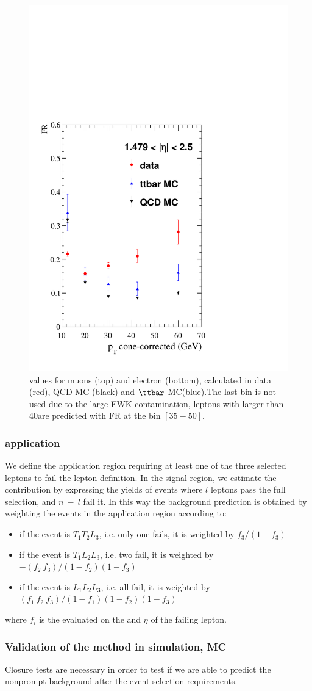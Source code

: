\begin{figure}[h!]
\includegraphics[width=.23\textwidth]{Figures/c5/FAKE/ele3.pdf}
\caption{\fr values for muons (top) and electron (bottom), calculated in data (red), QCD MC (black) and $\ttbar$ MC(blue).The last bin is not used due to the large EWK contamination, leptons with \pt larger than 40\GeV are predicted with FR at the bin $[35-50]$\GeV.}
\label{fig:comparison_muon}
\end{figure}


\subsubsection{\fr application}
We define the application region requiring at least one of the three
selected leptons to fail the \ti  lepton definition. In the signal region, we estimate the contribution by expressing the yields of events where $l$ leptons pass the full selection, and $n \ - \ l$ fail it. In this way the background prediction is obtained by weighting the events in the application region according to:
\begin{itemize}
\setlength\itemsep{-0.2em}
\item if the event is $T_{1}T_{2}L_{3}$, i.e. only one fails, it is weighted by $f_{3}/(1-f_{3})$
\item if the event is $T_{1}L_{2}L_{3}$, i.e. two fail, it is weighted
  by $- (f_{2} \ f_{3})/(1-f_{2})(1-f_{3})$
\item if the event is $L_{1}L_{2}L_{3}$, i.e. all fail, it is weighted by $(f_{1} \ f_{2} \ f_{3})/(1-f_{1})(1-f_{2})(1-f_{3})$
\end{itemize}
where $f_{i}$ is the \fr evaluated on the \ptcone and $\eta$
of the failing lepton.\\


\subsubsection{Validation of the \ttol method in simulation, \ttbar MC }
Closure tests are necessary in order to test if we are able to predict
the nonprompt background after the event selection requirements.


